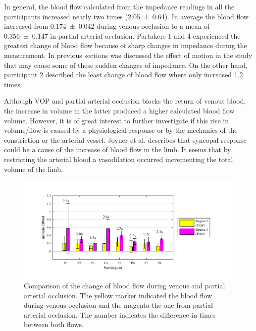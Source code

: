 In general, the blood flow calculated from the impedance readings in all the participants increased nearly two times (\num{2.05(064)}). In average the blood flow increased from \SI{0.174(0042)}{\bfv} during venous occlusion to a mean of \SI{0.356(0147)}{\bfv} in partial arterial occlusion. Partakers 1 and 4 experienced the greatest change of blood flow because of sharp changes in impedance during the measurement. In previous sections was discussed the effect of motion in the study that may cause some of these sudden changes of impedance. On the other hand, participant 2 described the least change of blood flow where only increased 1.2 times. 

Although VOP and partial arterial occlusion blocks the return of venous blood, the increase in volume in the latter produced a higher calculated blood flow volume. However, it is of great interest to further investigate if this rise in volume/flow is caused by a physiological response or by the mechanics of the constriction or the arterial vessel. Joyner et al. \cite{joyner2001belfast} describes that syncopal response could be a cause of the increase of blood flow in the limb. It seems that by restricting the arterial blood a vasodilation occurred incrementing the total volume of the limb. 

\begin{figure}[!htpb]
	\includegraphics[width=\textwidth,clip]{figure_vop_12}    
	\caption[Comparison of the change of blood flow during venous and partial arterial occlusion]{Comparison of the change of blood flow during venous and partial arterial occlusion. The yellow marker indicated the blood flow during venous occlusion and the magenta the one from partial arterial occlusion. The number indicates the difference in times between both flows.}
	\label{fig:iPG_flow_comparative}
\end{figure}


